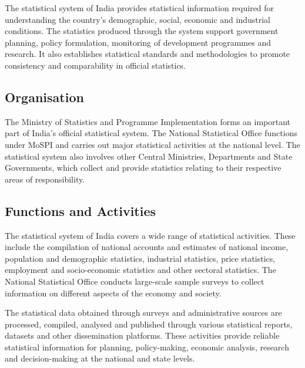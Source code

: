 \documentclass[12pt,a4paper]{article}
\begin{document}
The statistical system of India provides statistical information required for understanding the country's demographic, social, economic and industrial conditions. The statistics produced through the system support government planning, policy formulation, monitoring of development programmes and research. It also establishes statistical standards and methodologies to promote consistency and comparability in official statistics.

\subsection{Organisation}

The Ministry of Statistics and Programme Implementation forms an important part of India's official statistical system. The National Statistical Office functions under MoSPI and carries out major statistical activities at the national level. The statistical system also involves other Central Ministries, Departments and State Governments, which collect and provide statistics relating to their respective areas of responsibility.

\subsection{Functions and Activities}

The statistical system of India covers a wide range of statistical activities. These include the compilation of national accounts and estimates of national income, population and demographic statistics, industrial statistics, price statistics, employment and socio-economic statistics and other sectoral statistics. The National Statistical Office conducts large-scale sample surveys to collect information on different aspects of the economy and society.

The statistical data obtained through surveys and administrative sources are processed, compiled, analysed and published through various statistical reports, datasets and other dissemination platforms. These activities provide reliable statistical information for planning, policy-making, economic analysis, research and decision-making at the national and state levels.
\end{document}
